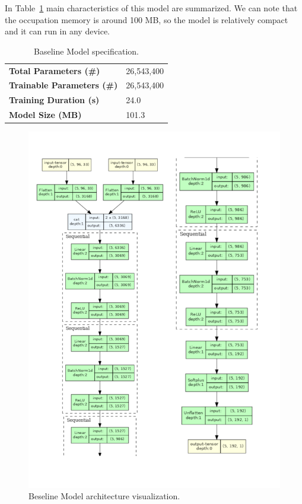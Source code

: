 In Table~\ref{tab:ufcnspecs} main characteristics of this model are summarized. We can note that the occupation memory is around 100 MB, so the model is relatively compact and it can run in any device.

\begin{table}[H]
	\begin{center}
		\begin{tabular}[c]{l|l}

			\textbf{Total Parameters (\#)}     & 26,543,400 \\
			\textbf{Trainable Parameters (\#)} & 26,543,400 \\
			\textbf{Training Duration (s)}     & 24.0       \\
			\textbf{Model Size (MB)}           & 101.3
		\end{tabular}
	\end{center}
	\caption{Baseline Model specification.}\label{tab:ufcnspecs}
\end{table}

\begin{figure}[H]
	\centering
	\includegraphics[height=.9\textheight]{chapters/3_models/imgs/ufcmodel.png}
	\caption{Beseline Model architecture visualization.}\label{fig:baselinemodelarch}
\end{figure}

